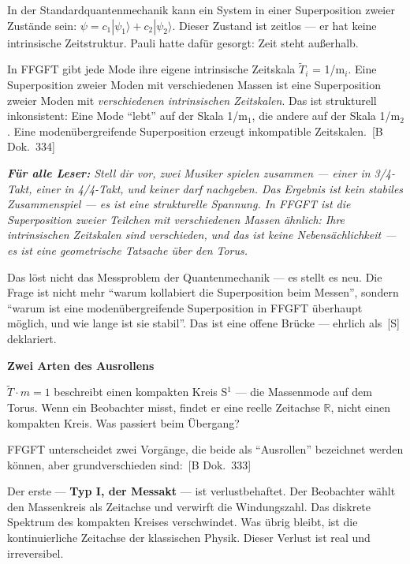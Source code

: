 \documentclass[11pt,oneside]{book}
\newcommand{\status}[1]{\penalty10000\,{\scriptsize\textcolor{gray!60}{[#1]}}}
\newenvironment{laierspur}{%
  \par\vspace{4pt}%
  \noindent\small\itshape\color{blue!60!black}%
  \textbf{Für alle Leser:}\enspace\ignorespaces}{%
  \par\vspace{4pt}\normalsize\normalfont\normalcolor}
\begin{document}
In der Standardquantenmechanik kann ein System in einer Superposition
zweier Zustände sein: $\psi = c_1|\psi_1\rangle + c_2|\psi_2\rangle$. Dieser Zustand ist zeitlos
— er hat keine intrinsische Zeitstruktur. Pauli hatte dafür gesorgt: Zeit
steht außerhalb.


In FFGFT gibt jede Mode ihre eigene intrinsische Zeitskala $\tilde{T}_i$ = 1/m$_i$.
Eine Superposition zweier Moden mit verschiedenen Massen ist eine
Superposition zweier Moden mit \textit{verschiedenen intrinsischen Zeitskalen}.
Das ist strukturell inkonsistent: Eine Mode \enquote{lebt} auf der Skala 1/m$_1$,
die andere auf der Skala 1/m$_2$. Eine modenübergreifende Superposition
erzeugt inkompatible Zeitskalen. \status{B Dok.~334}


\begin{laierspur}
Stell dir vor, zwei Musiker spielen zusammen — einer in 3/4-
Takt, einer in 4/4-Takt, und keiner darf nachgeben. Das Ergebnis ist kein
stabiles Zusammenspiel — es ist eine strukturelle Spannung. In FFGFT ist
die Superposition zweier Teilchen mit verschiedenen Massen ähnlich: Ihre
intrinsischen Zeitskalen sind verschieden, und das ist keine Nebensächlichkeit
— es ist eine geometrische Tatsache über den Torus.
\end{laierspur}

Das löst nicht das Messproblem der Quantenmechanik — es stellt es neu.
Die Frage ist nicht mehr \enquote{warum kollabiert die Superposition beim Messen},
sondern \enquote{warum ist eine modenübergreifende Superposition in FFGFT überhaupt
möglich, und wie lange ist sie stabil}. Das ist eine offene Brücke — ehrlich
als \status{S} deklariert.


\textbf{Zwei Arten des Ausrollens}


$\tilde{T}\cdot m = 1$ beschreibt einen kompakten Kreis S$^1$ — die Massenmode auf dem
Torus. Wenn ein Beobachter misst, findet er eine reelle Zeitachse $\mathbb{R}$, nicht
einen kompakten Kreis. Was passiert beim Übergang?


FFGFT unterscheidet zwei Vorgänge, die beide als \enquote{Ausrollen} bezeichnet
werden können, aber grundverschieden sind: \status{B Dok.~333}


Der erste — \textbf{Typ I, der Messakt} — ist verlustbehaftet. Der Beobachter
wählt den Massenkreis als Zeitachse und verwirft die Windungszahl. Das
diskrete Spektrum des kompakten Kreises verschwindet. Was übrig bleibt,
ist die kontinuierliche Zeitachse der klassischen Physik. Dieser Verlust
ist real und irreversibel.
\end{document}
